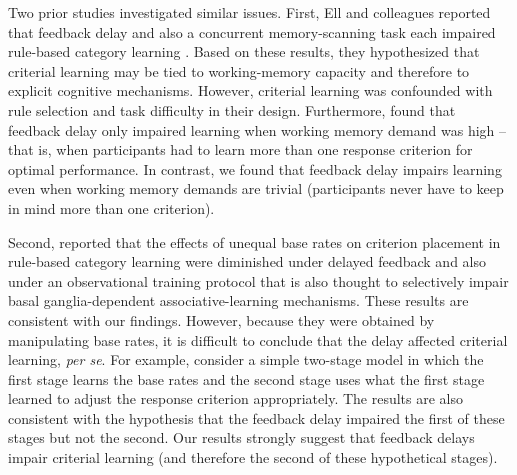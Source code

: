 \documentclass[doc, floatsintext]{apa7}
\begin{document}
Two prior studies investigated similar issues. First, Ell
and colleagues reported that feedback delay and also a
concurrent memory-scanning task each impaired rule-based
category learning \parencite{ell2009critrial}. Based on
these results, they hypothesized that criterial learning may
be tied to working-memory capacity and therefore to explicit
cognitive mechanisms. However, criterial learning was
confounded with rule selection and task difficulty in their
design.  Furthermore, \textcite{ell2009critrial} found that
feedback delay only impaired learning when working memory
demand was high -- that is, when participants had to learn
more than one response criterion for optimal performance. In
contrast, we found that feedback delay impairs learning even
when working memory demands are trivial (participants never
have to keep in mind more than one criterion).

Second, \textcite{bohil2014implicit} reported that the
effects of unequal base rates on criterion placement in
rule-based category learning were diminished under delayed
feedback and also under an observational training protocol
that is also thought to selectively impair basal
ganglia-dependent associative-learning mechanisms. These
results are consistent with our findings. However, because
they were obtained by manipulating base rates, it is
difficult to conclude that the delay affected criterial
learning, \emph{per se}. For example, consider a simple
two-stage model in which the first stage learns the base
rates and the second stage uses what the first stage learned
to adjust the response criterion appropriately. The
\textcite{bohil2014implicit} results are also consistent
with the hypothesis that the feedback delay impaired the
first of these stages but not the second. Our results
strongly suggest that feedback delays impair criterial
learning (and therefore the second of these hypothetical
stages).
\end{document}

